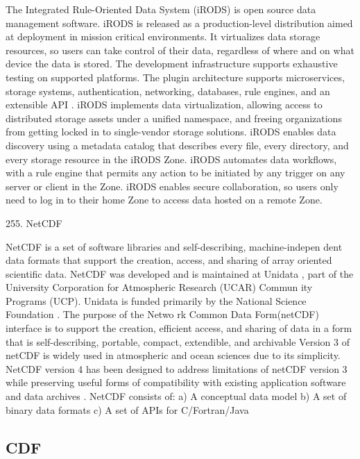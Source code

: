      The Integrated Rule-Oriented Data System (iRODS) is open source
     data management software. iRODS is released as a production-level
     distribution aimed at deployment in mission critical
     environments. It virtualizes data storage resources, so users can
     take control of their data, regardless of where and on what
     device the data is stored. The development infrastructure
     supports exhaustive testing on supported platforms. The plugin
     architecture supports microservices, storage systems,
     authentication, networking, databases, rule engines, and an
     extensible API \cite{irods-www}.  iRODS implements data
     virtualization, allowing access to distributed storage assets
     under a unified namespace, and freeing organizations from getting
     locked in to single-vendor storage solutions. iRODS enables data
     discovery using a metadata catalog that describes every file,
     every directory, and every storage resource in the iRODS
     Zone. iRODS automates data workflows, with a rule engine that
     permits any action to be initiated by any trigger on any server
     or client in the Zone. iRODS enables secure collaboration, so
     users only need to log in to their home Zone to access data
     hosted on a remote Zone. \cite{github-irods-www}


255. NetCDF

NetCDF is a set of software libraries and self-describing,
machine-indepen dent data formats that support the creation, access,
and sharing of array oriented scientific data. NetCDF was developed
and is maintained at Unidata , part of the University Corporation for
Atmospheric Research (UCAR) Commun ity Programs (UCP). Unidata is
funded primarily by the National Science Foundation
\cite{paper-netCDF} \cite{www-netcdf} . The purpose of the Netwo rk
Common Data Form(netCDF) interface is to support the creation,
efficient access, and sharing of data in a form that is
self-describing, portable, compact, extendible, and archivable Version
3 of netCDF is widely used in atmospheric and ocean sciences due to
its simplicity. NetCDF version 4 has been designed to address
limitations of netCDF version 3 while preserving useful forms of
compatibility with existing application software and data archives
\cite{paper-netCDF}.  NetCDF consists of: a) A conceptual data model
b) A set of binary data formats c) A set of APIs for C/Fortran/Java

\subsection{ CDF}

